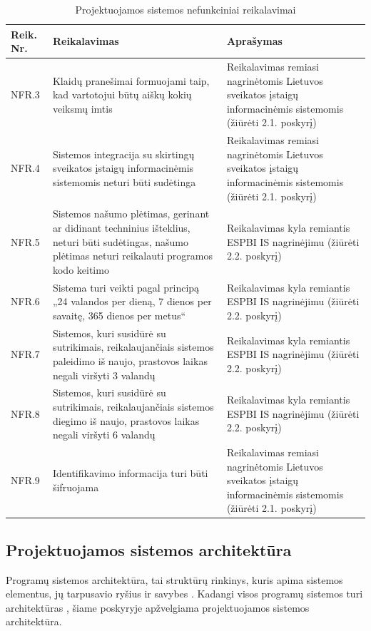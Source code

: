 \begin{table}[!ht]
    \centering
    \renewcommand{\arraystretch}{1.2}
    \renewcommand\thetable{6}

    \begin{tabular}{|m{3em}|m{17em}|m{17em}|}
    \hline 
    \rowcolor[HTML]{EFEFEF} 
    Reik. Nr. & Reikalavimas & Aprašymas \\ \hline
    NFR.3  & Klaidų pranešimai formuojami taip, kad vartotojui būtų aiškų kokių veiksmų imtis  &   Reikalavimas remiasi nagrinėtomis Lietuvos sveikatos įstaigų informacinėmis sistemomis (žiūrėti 2.1. poskyrį)       \\ \hline
    NFR.4  &  Sistemos integracija su skirtingų sveikatos įstaigų informacinėmis sistemomis neturi būti sudėtinga  &   Reikalavimas remiasi nagrinėtomis Lietuvos sveikatos įstaigų informacinėmis sistemomis (žiūrėti 2.1. poskyrį)       \\ \hline
    NFR.5  &  Sistemos našumo plėtimas, gerinant ar didinant techninius išteklius, neturi būti sudėtingas, našumo plėtimas neturi reikalauti programos kodo keitimo  &   Reikalavimas kyla remiantis ESPBI IS nagrinėjimu (žiūrėti 2.2. poskyrį)       \\ \hline
    NFR.6  &   Sistema turi veikti pagal principą „24 valandos per dieną, 7 dienos per savaitę, 365 dienos per metus“  &  Reikalavimas kyla remiantis ESPBI IS nagrinėjimu (žiūrėti 2.2. poskyrį)       \\ \hline
    NFR.7  &  Sistemos, kuri susidūrė su sutrikimais, reikalaujančiais sistemos paleidimo iš naujo, prastovos laikas negali viršyti 3 valandų  &   Reikalavimas kyla remiantis ESPBI IS nagrinėjimu (žiūrėti 2.2. poskyrį)       \\ \hline
    NFR.8  &  Sistemos, kuri susidūrė su sutrikimais, reikalaujančiais sistemos diegimo iš naujo, prastovos laikas negali viršyti 6 valandų  &   Reikalavimas kyla remiantis ESPBI IS nagrinėjimu (žiūrėti 2.2. poskyrį)       \\ \hline
    NFR.9  &  Identifikavimo informacija turi būti šifruojama  &   Reikalavimas remiasi nagrinėtomis Lietuvos sveikatos įstaigų informacinėmis sistemomis (žiūrėti 2.1. poskyrį)       \\ \hline
    \end{tabular}
    \caption{Projektuojamos sistemos nefunkciniai reikalavimai} 

\end{table}

\subsection{Projektuojamos sistemos architektūra}
Programų sistemos architektūra, tai struktūrų rinkinys, kuris apima sistemos elementus, jų tarpusavio ryšius ir savybes \cite{Bass2013}. Kadangi visos programų sistemos turi architektūras \cite{Bass2013}, šiame poskyryje apžvelgiama projektuojamos sistemos architektūra.

